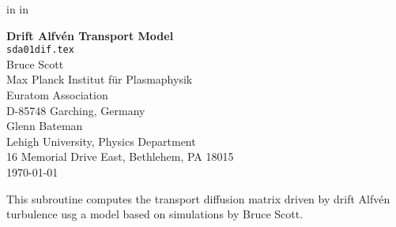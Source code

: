 
\headheight 0pt \headsep 0pt          
\topmargin 0pt   in
\oddsidemargin 0pt  in

\newcommand{\Partial}[2]{\frac{\partial #1}{\partial #2}}
\newcommand{\jacobian}{{\cal J}}



\begin{center} 
\large {\bf Drift Alfv\'{e}n Transport Model} \\
\normalsize  {\tt sda01dif.tex} \\
\vspace{1pc}
Bruce Scott \\
Max Planck Institut f\"{u}r Plasmaphysik \\
Euratom Association \\
D-85748 Garching, Germany \\
\vspace{1pc}
Glenn Bateman \\
Lehigh University, Physics Department \\
16 Memorial Drive East, Bethlehem, PA 18015 \\
\vspace{1pc}
\today
\end{center}

This subroutine computes the transport diffusion matrix driven by
drift Alfv\'{e}n turbulence usg a model based on
simulations by Bruce Scott.

